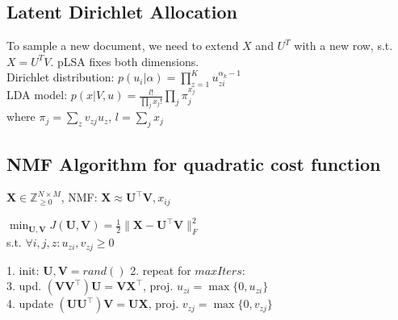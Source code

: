 \subsection*{Latent Dirichlet Allocation}
To sample a new document, we need to extend $X$ and $U^T$ with a new row, s.t. $X=U^T V$. pLSA fixes both dimensions.\\
Dirichlet distribution: $p(u_i|\alpha) = \prod_{z=1}^K u_{zi}^{\alpha_k-1}$\\
LDA model: $p(x|V,u) = \frac{l!}{\prod_j x_j!}\prod_j \pi_j^{x_j}$\\
where $\pi_j=\sum_z v_{zj} u_z$, $l=\sum_j x_j$

\subsection*{NMF Algorithm for quadratic cost function}
$\mathbf{X} \in \mathbb{Z}^{N \times M}_{\geq 0}$, NMF: $\mathbf{X} \approx \mathbf{U^\top V}, x_{ij}$

$\min_{\mathbf{U}, \mathbf{V}} J(\mathbf{U}, \mathbf{V}) = \frac{1}{2} \|\mathbf{X} - \mathbf{U}^\top\mathbf{V}\|_F^2$\\
s.t. $\forall i,j,z:u_{zi},v_{zj} \geq 0 $


1. init: $\mathbf{U}, \mathbf{V} = rand()$ 2. repeat for $\mathit{maxIters}$:\\
3. upd. $(\mathbf{VV}^\top)\mathbf{U} = \mathbf{VX}^\top$, proj. $u_{zi} = \max \{ 0, u_{zi} \}$\\
4. update $(\mathbf{UU}^\top)\mathbf{V} = \mathbf{UX}$, proj. $v_{zj} = \max \{ 0, v_{zj} \}$
